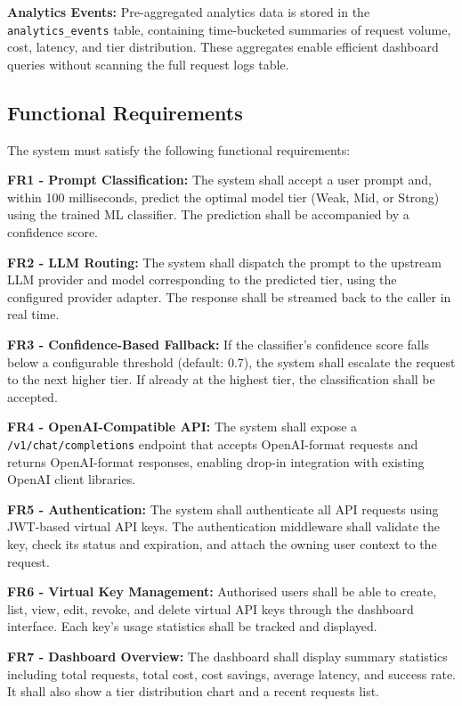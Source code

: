 \documentclass[oneside,12pt,a4paper]{report}
\begin{document}
\textbf{Analytics Events:} Pre-aggregated analytics data is stored in the \texttt{analytics\_events} table, containing time-bucketed summaries of request volume, cost, latency, and tier distribution. These aggregates enable efficient dashboard queries without scanning the full request logs table.

\subsection{Functional Requirements}

The system must satisfy the following functional requirements:

\textbf{FR1 - Prompt Classification:} The system shall accept a user prompt and, within 100 milliseconds, predict the optimal model tier (Weak, Mid, or Strong) using the trained ML classifier. The prediction shall be accompanied by a confidence score.

\textbf{FR2 - LLM Routing:} The system shall dispatch the prompt to the upstream LLM provider and model corresponding to the predicted tier, using the configured provider adapter. The response shall be streamed back to the caller in real time.

\textbf{FR3 - Confidence-Based Fallback:} If the classifier's confidence score falls below a configurable threshold (default: 0.7), the system shall escalate the request to the next higher tier. If already at the highest tier, the classification shall be accepted.

\textbf{FR4 - OpenAI-Compatible API:} The system shall expose a \texttt{/v1/chat/completions} endpoint that accepts OpenAI-format requests and returns OpenAI-format responses, enabling drop-in integration with existing OpenAI client libraries.

\textbf{FR5 - Authentication:} The system shall authenticate all API requests using JWT-based virtual API keys. The authentication middleware shall validate the key, check its status and expiration, and attach the owning user context to the request.

\textbf{FR6 - Virtual Key Management:} Authorised users shall be able to create, list, view, edit, revoke, and delete virtual API keys through the dashboard interface. Each key's usage statistics shall be tracked and displayed.

\textbf{FR7 - Dashboard Overview:} The dashboard shall display summary statistics including total requests, total cost, cost savings, average latency, and success rate. It shall also show a tier distribution chart and a recent requests list.
\end{document}

